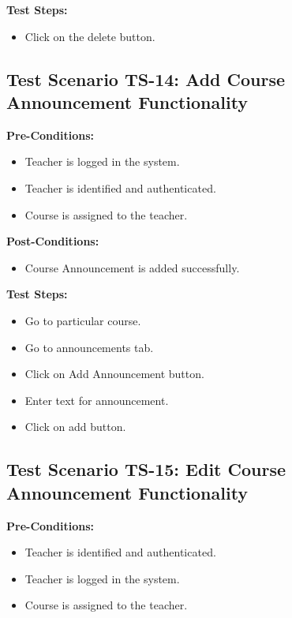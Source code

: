 \textbf{Test Steps:}
\begin{itemize}

\item Click on the delete button.

\end{itemize}






\subsection{Test Scenario TS-14: Add Course Announcement Functionality}
\textbf{Pre-Conditions: }
\begin{itemize}

\item Teacher is logged in the system.
\item Teacher is identified and authenticated.
\item Course is assigned to the teacher.

\end{itemize}

\textbf{Post-Conditions: }
\begin{itemize}

\item Course Announcement is added successfully.

\end{itemize}


\textbf{Test Steps:}
\begin{itemize}

\item Go to particular course.
\item Go to announcements tab.
\item Click on Add Announcement button.
\item Enter text for announcement.
\item Click on add button.

\end{itemize}



\subsection{Test Scenario TS-15: Edit Course Announcement Functionality}
\textbf{Pre-Conditions: }
\begin{itemize}

\item Teacher is identified and authenticated.
\item Teacher is logged in the system.
\item Course is assigned to the teacher.

\end{itemize}

